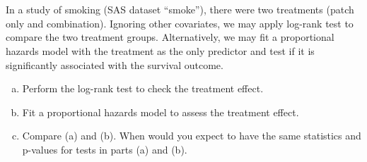 \documentclass[12pt]{elegantbook}
\begin{document}
 

\setcounter{chapter}{4}
\chapter{}

    
    \begin{exercise*}[1]
        In a study of smoking (SAS dataset “smoke”), there were two treatments (patch only and combination). Ignoring other covariates, we may apply log-rank test to compare the two treatment groups. Alternatively, we may fit a proportional hazards model with the treatment as the only predictor and test if it is significantly associated with the survival outcome. 
        \begin{enumerate}[(a)]
            \item Perform the log-rank test to check the treatment effect. 
            \item Fit a proportional hazards model to assess the treatment effect.
            \item Compare (a) and (b). When would you expect to have the same statistics and p-values for tests in parts (a) and (b). 
        \end{enumerate}
    \end{exercise*}
\end{document}
